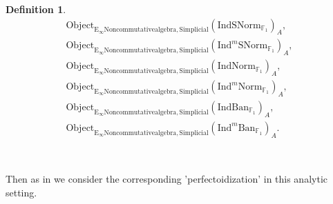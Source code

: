 \documentclass[11pt]{book}
\theoremstyle{definition}
\newtheorem{definition}[theorem]{Definition}
\numberwithin{equation}{section}
\begin{document}
\begin{definition}
\begin{align}
\mathrm{Object}_{\mathrm{E}_\infty\mathrm{Noncommutativealgebra},\mathrm{Simplicial}}(\mathrm{IndSNorm}_{\mathbb{F}_1})_A,\\
\mathrm{Object}_{\mathrm{E}_\infty\mathrm{Noncommutativealgebra},\mathrm{Simplicial}}(\mathrm{Ind}^m\mathrm{SNorm}_{\mathbb{F}_1})_A,\\
\mathrm{Object}_{\mathrm{E}_\infty\mathrm{Noncommutativealgebra},\mathrm{Simplicial}}(\mathrm{IndNorm}_{\mathbb{F}_1})_A,\\
\mathrm{Object}_{\mathrm{E}_\infty\mathrm{Noncommutativealgebra},\mathrm{Simplicial}}(\mathrm{Ind}^m\mathrm{Norm}_{\mathbb{F}_1})_A,\\
\mathrm{Object}_{\mathrm{E}_\infty\mathrm{Noncommutativealgebra},\mathrm{Simplicial}}(\mathrm{IndBan}_{\mathbb{F}_1})_A,\\
\mathrm{Object}_{\mathrm{E}_\infty\mathrm{Noncommutativealgebra},\mathrm{Simplicial}}(\mathrm{Ind}^m\mathrm{Ban}_{\mathbb{F}_1})_A.
\end{align}
\end{definition}

\

\indent Then as in \cite[Definition 8.2]{12BS} we consider the corresponding 'perfectoidization' in this analytic setting. 
\end{document}
